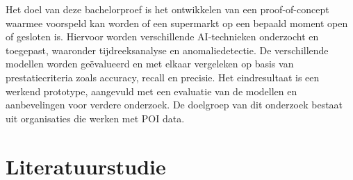 Het doel van deze bachelorproef is het ontwikkelen van een proof-of-concept waarmee voorspeld kan worden of een supermarkt op een 
bepaald moment open of gesloten is. Hiervoor worden verschillende AI-technieken onderzocht en toegepast, waaronder tijdreeksanalyse en 
anomaliedetectie. De verschillende modellen worden geëvalueerd en met elkaar vergeleken op basis van prestatiecriteria zoals accuracy, 
recall en precisie. Het eindresultaat is een werkend prototype, aangevuld met een evaluatie van de modellen en aanbevelingen voor verdere 
onderzoek. De doelgroep van dit onderzoek bestaat uit organisaties die werken met POI data.

\section{Literatuurstudie}%
\label{sec:literatuurstudie}







